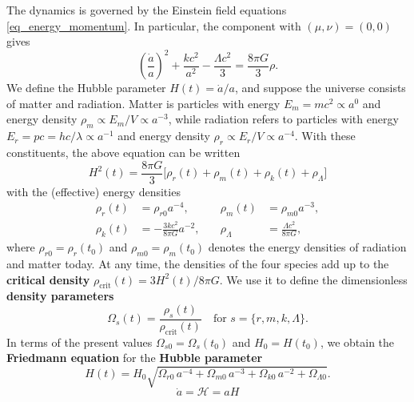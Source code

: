 \documentclass{aa}
\begin{document}
The dynamics is governed by the Einstein field equations \eqref{eq_energy_momentum}.
In particular, the component with $(\mu,\nu)=(0,0)$ gives
\begin{equation*}
	\left( \frac{\dot{a}}{a} \right)^2 + \frac{kc^2}{a^2} - \frac{\Lambda c^2}{3} = \frac{8 \pi G}{3} \rho.
\end{equation*}
We define the Hubble parameter $H(t) = \dot{a} / a$,
and suppose the universe consists of matter and radiation.
Matter is particles with energy $E_m=mc^2 \propto a^0$ and energy density $\rho_m \propto E_m/V \propto a^{-3}$,
while radiation refers to particles with energy $E_r=pc=hc/\lambda \propto a^{-1}$ and energy density $\rho_r \propto E_r/V \propto a^{-4}$.
With these constituents, the above equation can be written 
\begin{equation*}
	H^2(t) = \frac{8 \pi G}{3} \Big[ \rho_r(t) + \rho_m(t) + \rho_k(t) + \rho_\Lambda \Big]
\end{equation*}
with the (effective) energy densities
\begin{equation}
\begin{aligned}
	\rho_r(t) &= \rho_{r0} a^{-4}, &\quad \rho_m(t) &= \rho_{m0} a^{-3}, \\
	\rho_k(t) &= -\frac{3kc^2}{8\pi G} a^{-2}, &\quad \rho_\Lambda &= \frac{\Lambda c^2}{8 \pi G},
\end{aligned}
\end{equation}
where $\rho_{r0} = \rho_r(t_0)$ and $\rho_{m0} = \rho_m(t_0)$ denotes the energy densities of radiation and matter today.
At any time, the densities of the four species add up to the \textbf{critical density} $\rho_\text{crit}(t) = 3 H^2(t) / 8 \pi G$.
We use it to define the dimensionless \textbf{density parameters}
\begin{equation}
	\Omega_s(t) = \frac{\rho_s(t)}{\rho_\text{crit}(t)}
	\quad \text{for $s = \{r,m,k,\Lambda\}$}.
\label{eq_density_parameters}
\end{equation}
In terms of the present values $\Omega_{s0} = \Omega_s(t_0)$ and $H_0 = H(t_0)$,
we obtain the \textbf{Friedmann equation} for the \textbf{Hubble parameter}
\begin{equation}
	H(t) = H_0 \sqrt{\Omega_{r0} \, a^{-4} + \Omega_{m0} \, a^{-3} + \Omega_{k0} \, a^{-2} + \Omega_{\Lambda0}}.
\label{eq_friedmann}
\end{equation}
\begin{equation}
	\dot{a} = \mathcal{H} = aH
\label{eq_conformal_hubble}
\end{equation}
\end{document}
